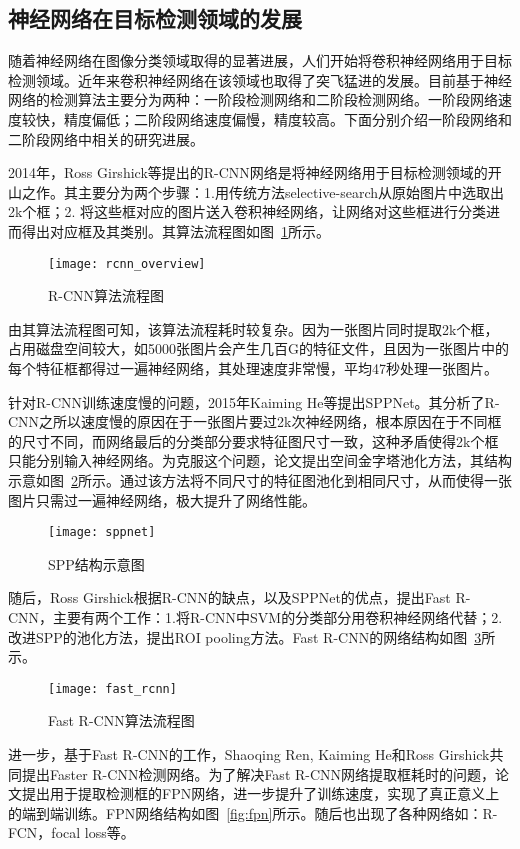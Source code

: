 \subsection{神经网络在目标检测领域的发展}
随着神经网络在图像分类领域取得的显著进展，人们开始将卷积神经网络用于目标检测领域。近年来卷积神经网络在该领域也取得了突飞猛进的发展。目前基于神经网络的检测算法主要分为两种：一阶段检测网络和二阶段检测网络。一阶段网络速度较快，精度偏低；二阶段网络速度偏慢，精度较高。下面分别介绍一阶段网络和二阶段网络中相关的研究进展。

2014年，Ross Girshick等提出的R-CNN网络是将神经网络用于目标检测领域的开山之作。其主要分为两个步骤：1.用传统方法selective-search从原始图片中选取出2k个框；2. 将这些框对应的图片送入卷积神经网络，让网络对这些框进行分类进而得出对应框及其类别。其算法流程图如图~\ref{fig:rcnn_overview}所示。

\begin{figure}[htp]
\centering
\texttt{[image: rcnn\_overview]}
\caption{R-CNN算法流程图}
\label{fig:rcnn_overview}
\end{figure}
由其算法流程图可知，该算法流程耗时较复杂。因为一张图片同时提取2k个框，占用磁盘空间较大，如5000张图片会产生几百G的特征文件，且因为一张图片中的每个特征框都得过一遍神经网络，其处理速度非常慢，平均47秒处理一张图片。

针对R-CNN训练速度慢的问题，2015年Kaiming He等提出SPPNet。其分析了R-CNN之所以速度慢的原因在于一张图片要过2k次神经网络，根本原因在于不同框的尺寸不同，而网络最后的分类部分要求特征图尺寸一致，这种矛盾使得2k个框只能分别输入神经网络。为克服这个问题，论文提出空间金字塔池化方法，其结构示意如图~\ref{fig:sppnet}所示。通过该方法将不同尺寸的特征图池化到相同尺寸，从而使得一张图片只需过一遍神经网络，极大提升了网络性能。

\begin{figure}[htp]
\centering
\texttt{[image: sppnet]}
\caption{SPP结构示意图}
\label{fig:sppnet}
\end{figure}
随后，Ross Girshick根据R-CNN的缺点，以及SPPNet的优点，提出Fast R-CNN，主要有两个工作：1.将R-CNN中SVM的分类部分用卷积神经网络代替；2.改进SPP的池化方法，提出ROI pooling方法。Fast R-CNN的网络结构如图~\ref{fig:fast_rcnn}所示。

\begin{figure}[htp]
\centering
\texttt{[image: fast\_rcnn]}
\caption{Fast R-CNN算法流程图}
\label{fig:fast_rcnn}
\end{figure}
进一步，基于Fast R-CNN的工作，Shaoqing Ren, Kaiming He和Ross Girshick共同提出Faster R-CNN检测网络。为了解决Fast R-CNN网络提取框耗时的问题，论文提出用于提取检测框的FPN网络，进一步提升了训练速度，实现了真正意义上的端到端训练。FPN网络结构如图~\ref{fig:fpn}所示。随后也出现了各种网络如：R-FCN，focal loss等。

